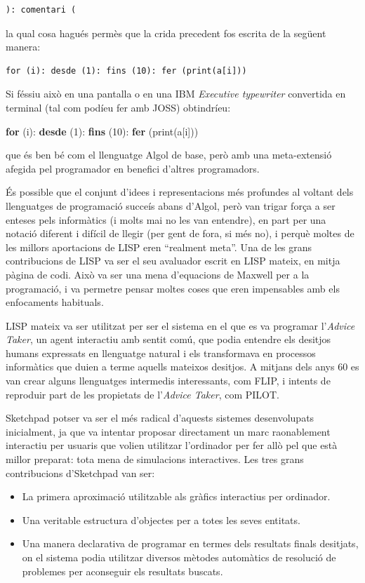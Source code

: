 \begin{verbatim}
): comentari (
\end{verbatim}

\noindent
la qual cosa hagués permès que la crida precedent fos escrita de la següent manera:

\begin{verbatim}
for (i): desde (1): fins (10): fer (print(a[i]))
\end{verbatim}

\noindent
Si féssiu això en una pantalla o en una IBM \emph{Executive typewriter} convertida en terminal (tal com podíeu fer amb JOSS) obtindríeu:

\vspace{5mm}
\noindent
\textsf{{\bfseries for} (i): {\bfseries desde} (1): {\bfseries fins} (10): {\bfseries fer} (print(a[i]))}
\vspace{5mm}

\noindent
que és ben bé com el llenguatge Algol de base, però amb una meta-extensió afegida pel programador en benefici d'altres programadors.

És possible que el conjunt d'idees i representacions més profundes al voltant dels llenguatges de programació succeís abans d'Algol, però van trigar força a ser enteses pels informàtics (i molts mai no les van entendre), en part per  una notació diferent i difícil de llegir (per gent de fora, si més no), i perquè moltes de les millors aportacions de LISP eren ``realment meta''. Una de les grans contribucions de LISP va ser el seu avaluador escrit en LISP mateix, en mitja pàgina de codi. Això va ser una mena d'\textsf{equacions de Maxwell} per a la programació, i va permetre pensar moltes coses que eren impensables amb els enfocaments habituals.


LISP mateix va ser utilitzat per ser el sistema en el que es va programar l'\emph{Advice Taker}, un agent interactiu amb sentit comú, que podia entendre els desitjos humans expressats en llenguatge natural i els transformava en processos informàtics que duien a terme aquells mateixos desitjos. A mitjans dels anys 60 es van crear alguns llenguatges intermedis interessants, com FLIP, i intents de reproduir part de les propietats de l'\emph{Advice Taker}, com PILOT.

Sketchpad potser va ser el més radical d'aquests sistemes desenvolupats inicialment, ja que va intentar proposar directament un marc raonablement interactiu per usuaris que volien utilitzar l'ordinador per fer allò pel que està millor preparat: tota mena de simulacions interactives. Les tres grans contribucions d'Sketchpad van ser:
\begin{itemize}
\item La primera aproximació utilitzable als gràfics interactius per ordinador.
\item Una veritable estructura d'objectes per a totes les seves entitats.
\item Una manera declarativa de programar en termes dels resultats finals desitjats, on el sistema podia utilitzar diversos mètodes automàtics de resolució de problemes per aconseguir els resultats buscats.
\end{itemize}

